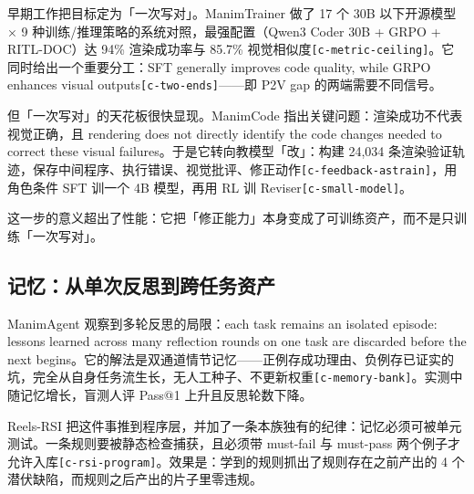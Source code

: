 早期工作把目标定为「一次写对」。ManimTrainer 做了 17 个 30B 以下开源模型 × 9 种训练/推理策略的系统对照，最强配置（Qwen3 Coder 30B + GRPO + RITL-DOC）达 94\% 渲染成功率与 85.7\% 视觉相似度{\scriptsize\texttt{[c-\hspace{0pt}metric-\hspace{0pt}ceiling]}}。它同时给出一个重要分工：SFT generally improves code quality, while GRPO enhances visual outputs{\scriptsize\texttt{[c-\hspace{0pt}two-\hspace{0pt}ends]}}——即 P2V gap 的两端需要不同信号。


但「一次写对」的天花板很快显现。ManimCode 指出关键问题：渲染成功不代表视觉正确，且 rendering does not directly identify the code changes needed to correct these visual failures。于是它转向教模型「改」：构建 24,034 条渲染验证轨迹，保存中间程序、执行错误、视觉批评、修正动作{\scriptsize\texttt{[c-\hspace{0pt}feedback-\hspace{0pt}astrain]}}，用角色条件 SFT 训一个 4B 模型，再用 RL 训 Reviser{\scriptsize\texttt{[c-\hspace{0pt}small-\hspace{0pt}model]}}。


这一步的意义超出了性能：它把「修正能力」本身变成了可训练资产，而不是只训练「一次写对」。


\subsection{记忆：从单次反思到跨任务资产}

ManimAgent 观察到多轮反思的局限：each task remains an isolated episode: lessons learned across many reflection rounds on one task are discarded before the next begins。它的解法是双通道情节记忆——正例存成功理由、负例存已证实的坑，完全从自身任务流生长，无人工种子、不更新权重{\scriptsize\texttt{[c-\hspace{0pt}memory-\hspace{0pt}bank]}}。实测中随记忆增长，盲测人评 Pass@1 上升且反思轮数下降。


Reels-RSI 把这件事推到程序层，并加了一条本族独有的纪律：记忆必须可被单元测试。一条规则要被静态检查捕获，且必须带 must-fail 与 must-pass 两个例子才允许入库{\scriptsize\texttt{[c-\hspace{0pt}rsi-\hspace{0pt}program]}}。效果是：学到的规则抓出了规则存在之前产出的 4 个潜伏缺陷，而规则之后产出的片子里零违规。


